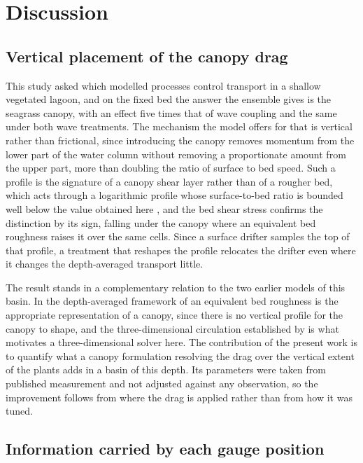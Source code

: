 \section{Discussion}
\label{sec:discussion}

\subsection{Vertical placement of the canopy drag}

This study asked which modelled processes control transport in a shallow
vegetated lagoon, and on the fixed bed the answer the ensemble gives is the
seagrass canopy, with an effect five times that of wave coupling and the same
under both wave treatments. The mechanism the model offers for that is vertical
rather than frictional, since introducing the canopy removes momentum from the
lower part of the water column without removing a proportionate amount from the
upper part, more than doubling the ratio of surface to bed speed. Such a profile
is the signature of a canopy shear layer rather than of a rougher bed, which
acts through a logarithmic profile whose surface-to-bed ratio is bounded well
below the value obtained here \citep{Nepf2012}, and the bed shear stress
confirms the distinction by its sign, falling under the canopy where an
equivalent bed roughness raises it over the same cells. Since a surface drifter
samples the top of that profile, a treatment that reshapes the profile relocates
the drifter even where it changes the depth-averaged transport little.

The result stands in a complementary relation to the two earlier models of this
basin. In the depth-averaged framework of \citet{Ingrassia2024} an equivalent
bed roughness is the appropriate representation of a canopy, since there is no
vertical profile for the canopy to shape, and the three-dimensional circulation
established by \citet{DeMarchis2012} is what motivates a three-dimensional
solver here. The contribution of the present work is to quantify what a canopy
formulation resolving the drag over the vertical extent of the plants adds in a
basin of this depth. Its parameters were taken from published measurement and
not adjusted against any observation, so the improvement follows from where the
drag is applied rather than from how it was tuned.

\subsection{Information carried by each gauge position}

